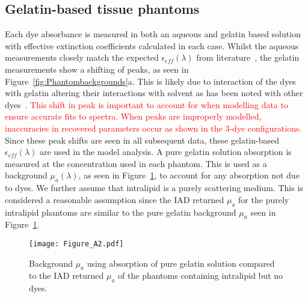 
\subsection{Gelatin-based tissue phantoms}\label{sec:resultsPhantoms}
Each dye absorbance is measured in both an aqueous and gelatin based solution with effective extinction coefficients calculated in each case. Whilst the aqueous measurements closely match the expected $\epsilon_{eff}(\lambda)$ from literature~\citep{Taniguchi2018}, the gelatin measurements show a shifting of peaks, as seen in Figure~\ref{fig:Phantombackgrounds}a. This is likely due to interaction of the dyes with gelatin altering their interactions with solvent as has been noted with other dyes~\citep{Cook2011}. \textcolor{red}{This shift in peak is important to account for when modelling data to ensure accurate fits to spectra. When peaks are improperly modelled, inaccuracies in recovered parameters occur as shown in the 3-dye configurations.}
Since these peak shifts are seen in all subsequent data, these gelatin-based $\epsilon_{eff}(\lambda)$ are used in the model analysis. A pure gelatin solution absorption is measured at the concentration used in each phantom. This is used as a background $\mu_a(\lambda)$, as seen in Figure~\ref{fig:muaback}, to account for any absorption not due to dyes.
We further assume that intralipid is a purely scattering medium. This is considered a reasonable assumption since the IAD returned $\mu_a$ for the purely intralipid phantoms are similar to the pure gelatin background $\mu_a$ seen in Figure~\ref{fig:muaback}.

\begin{figure}[htb!]
    \centering
    \texttt{[image: Figure\_A2.pdf]}
    \caption{Background $\mu_a$ using absorption of pure gelatin solution compared to the IAD returned $\mu_a$ of the phantoms containing intralipid but no dyes.}
 \label{fig:muaback}
\end{figure}

